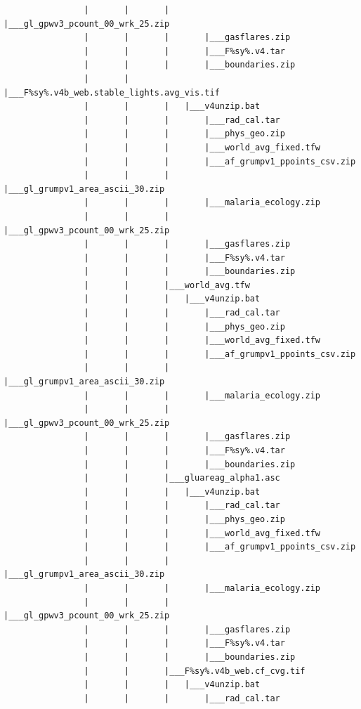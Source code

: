\documentclass[]{book}
\begin{document}
\begin{verbatim}
                |       |       |       |___gl_gpwv3_pcount_00_wrk_25.zip
                |       |       |       |___gasflares.zip
                |       |       |       |___F%sy%.v4.tar
                |       |       |       |___boundaries.zip
                |       |       |___F%sy%.v4b_web.stable_lights.avg_vis.tif
                |       |       |   |___v4unzip.bat
                |       |       |       |___rad_cal.tar
                |       |       |       |___phys_geo.zip
                |       |       |       |___world_avg_fixed.tfw
                |       |       |       |___af_grumpv1_ppoints_csv.zip
                |       |       |       |___gl_grumpv1_area_ascii_30.zip
                |       |       |       |___malaria_ecology.zip
                |       |       |       |___gl_gpwv3_pcount_00_wrk_25.zip
                |       |       |       |___gasflares.zip
                |       |       |       |___F%sy%.v4.tar
                |       |       |       |___boundaries.zip
                |       |       |___world_avg.tfw
                |       |       |   |___v4unzip.bat
                |       |       |       |___rad_cal.tar
                |       |       |       |___phys_geo.zip
                |       |       |       |___world_avg_fixed.tfw
                |       |       |       |___af_grumpv1_ppoints_csv.zip
                |       |       |       |___gl_grumpv1_area_ascii_30.zip
                |       |       |       |___malaria_ecology.zip
                |       |       |       |___gl_gpwv3_pcount_00_wrk_25.zip
                |       |       |       |___gasflares.zip
                |       |       |       |___F%sy%.v4.tar
                |       |       |       |___boundaries.zip
                |       |       |___gluareag_alpha1.asc
                |       |       |   |___v4unzip.bat
                |       |       |       |___rad_cal.tar
                |       |       |       |___phys_geo.zip
                |       |       |       |___world_avg_fixed.tfw
                |       |       |       |___af_grumpv1_ppoints_csv.zip
                |       |       |       |___gl_grumpv1_area_ascii_30.zip
                |       |       |       |___malaria_ecology.zip
                |       |       |       |___gl_gpwv3_pcount_00_wrk_25.zip
                |       |       |       |___gasflares.zip
                |       |       |       |___F%sy%.v4.tar
                |       |       |       |___boundaries.zip
                |       |       |___F%sy%.v4b_web.cf_cvg.tif
                |       |       |   |___v4unzip.bat
                |       |       |       |___rad_cal.tar

\end{verbatim}
\end{document}
